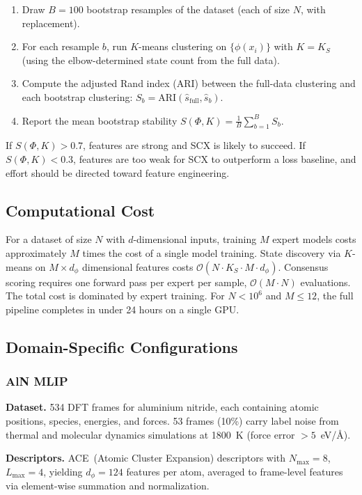\begin{enumerate}
	\item Draw $B = 100$ bootstrap resamples of the dataset (each of size $N$, with replacement).
	\item For each resample $b$, run $K$-means clustering on $\{\phi(x_i)\}$ with $K = K_S$ (using the elbow-determined state count from the full data).
	\item Compute the adjusted Rand index (ARI) between the full-data clustering and each bootstrap clustering: $S_b = \text{ARI}(\hat{s}_{\text{full}}, \hat{s}_b)$.
	\item Report the mean bootstrap stability $S(\Phi, K) = \frac{1}{B} \sum_{b=1}^B S_b$.
\end{enumerate}

If $S(\Phi, K) > 0.7$, features are strong and SCX is likely to succeed. If $S(\Phi, K) < 0.3$, features are too weak for SCX to outperform a loss baseline, and effort should be directed toward feature engineering.

\subsection{Computational Cost}

For a dataset of size $N$ with $d$-dimensional inputs, training $M$ expert models costs approximately $M$ times the cost of a single model training. State discovery via $K$-means on $M \times d_\phi$ dimensional features costs $\mathcal{O}(N \cdot K_S \cdot M \cdot d_\phi)$. Consensus scoring requires one forward pass per expert per sample, $\mathcal{O}(M \cdot N)$ evaluations. The total cost is dominated by expert training. For $N < 10^6$ and $M \leq 12$, the full pipeline completes in under 24 hours on a single GPU.

\subsection{Domain-Specific Configurations}

\subsubsection{AlN MLIP}
\textbf{Dataset.} 534 DFT frames for aluminium nitride, each containing atomic positions, species, energies, and forces. 53 frames (10\%) carry label noise from thermal and molecular dynamics simulations at 1800~K (force error $> 5$~eV/{\AA}).

\textbf{Descriptors.} ACE~(Atomic Cluster Expansion) descriptors with $N_{\text{max}} = 8$, $L_{\text{max}} = 4$, yielding $d_\phi = 124$ features per atom, averaged to frame-level features via element-wise summation and normalization.

